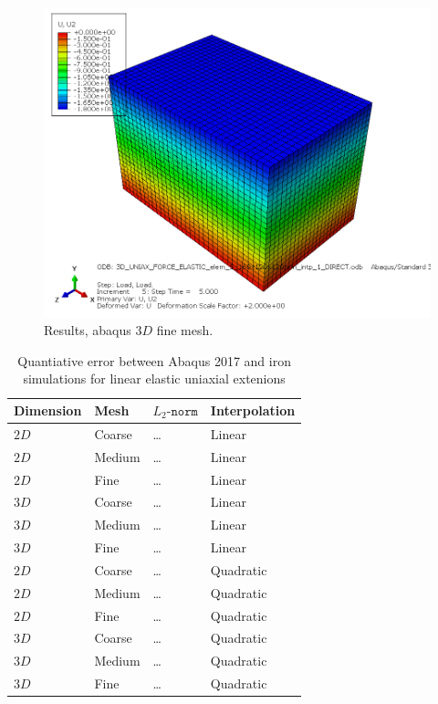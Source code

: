 \begin{figure}[h!]
    \centering 
    \includegraphics[width=\columnwidth]{examples/example-0111/doc/figures/3D_UNIAX_FORCE_ELASTIC_elem_5_160x120x120mm_intp_1_DIRECTU2.png}
    \caption{Results, abaqus $3D$ fine mesh.}
    \label{example-0111-abaqus-3D-fig}
\end{figure}
%
\begin{table}[h!]
	\centering
    \begin{tabular}{llll}
    Dimension & Mesh 		& $L_2\texttt{-norm}$			& Interpolation \\ \hline
    $2D$      & Coarse 	& \ldots									& Linear \\
    $2D$      & Medium  & \ldots									& Linear \\
    $2D$      & Fine  	& \ldots									& Linear \\
    $3D$      & Coarse  & \ldots									& Linear \\
    $3D$      & Medium  & \ldots									& Linear \\
		$3D$			&	Fine 		&	\ldots									& Linear \\
    $2D$      & Coarse 	& \ldots									& Quadratic \\
    $2D$      & Medium  & \ldots									& Quadratic \\
    $2D$      & Fine  	& \ldots									& Quadratic \\
    $3D$      & Coarse  & \ldots									& Quadratic \\
    $3D$      & Medium  & \ldots									& Quadratic \\
		$3D$			&	Fine 		&	\ldots									& Quadratic \\		
    \end{tabular}
		\caption{Quantiative error between Abaqus 2017 and iron simulations for linear elastic uniaxial extenions}
		\label{tab:example-0111-valid-Iron-Abaqus}
\end{table}
